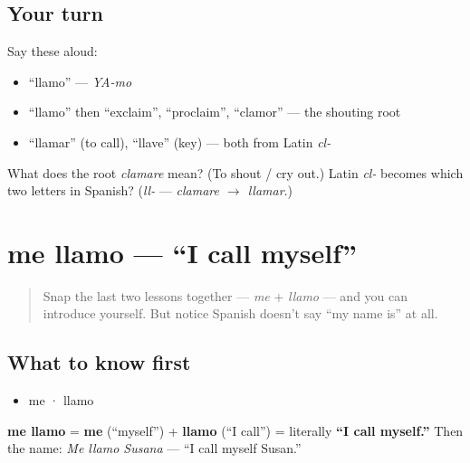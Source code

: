 \subsection*{Your turn}
Say these aloud:

\begin{itemize}
\raggedright
  \item \textquotedblleft{}llamo\textquotedblright{} — \emph{YA-mo}
  \item \textquotedblleft{}llamo\textquotedblright{} then \textquotedblleft{}exclaim\textquotedblright{}, \textquotedblleft{}proclaim\textquotedblright{}, \textquotedblleft{}clamor\textquotedblright{} — the shouting root
  \item \textquotedblleft{}llamar\textquotedblright{} (to call), \textquotedblleft{}llave\textquotedblright{} (key) — both from Latin \emph{cl-}
\end{itemize}

\begin{tcolorbox}[breakable,colback=teal!4,colframe=teal!35!black,title={Before you move on}]
What does the root \emph{clamare} mean? (To shout / cry out.) Latin \emph{cl-} becomes which two letters in Spanish? (\emph{ll-} — \emph{clamare $\to$ llamar}.)
\end{tcolorbox}
\section[me llamo]{me llamo — \textquotedblleft{}I call myself\textquotedblright{}}

\label{lesson:ES-C03-me-llamo}



\begin{quote}
Snap the last two lessons together — \emph{me} + \emph{llamo} — and you can introduce yourself. But notice Spanish doesn't say \textquotedblleft{}my name is\textquotedblright{} at all.
\end{quote}

\subsection*{What to know first}
\begin{itemize}
\raggedright
  \item me · llamo
\end{itemize}

\begin{cousinweb}
\textbf{me llamo} = \textbf{me} (\textquotedblleft{}myself\textquotedblright{}) + \textbf{llamo} (\textquotedblleft{}I call\textquotedblright{}) = literally \textbf{\textquotedblleft{}I call myself.\textquotedblright{}} Then the name: \emph{Me llamo Susana} — \textquotedblleft{}I call myself Susan.\textquotedblright{}
\end{cousinweb}

